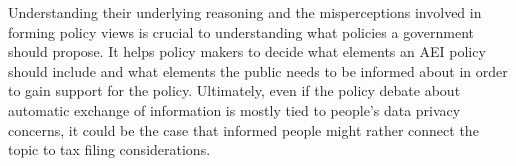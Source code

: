 \documentclass[11pt]{article}
\begin{document}
Understanding their underlying reasoning and the misperceptions involved in forming policy views is crucial to understanding what policies a government should propose. It helps policy makers to decide what elements an AEI policy should include and what elements the public needs to be informed about in order to gain support for the policy. Ultimately, even if the policy debate about automatic exchange of information is mostly tied to people's data privacy concerns, it could be the case that informed people might rather connect the topic to tax filing considerations.

\newpage
\printbibliography
\end{document}
